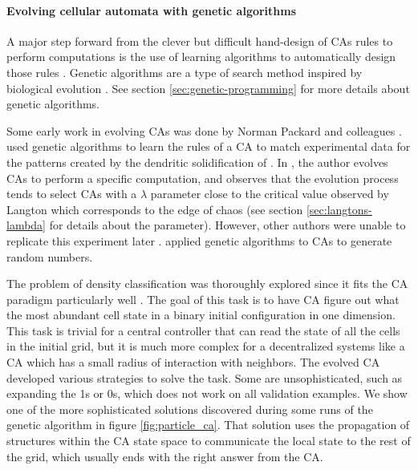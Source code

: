 \paragraph{Evolving cellular automata with genetic algorithms}
A major step forward from the clever but difficult hand-design of \acp{CA} rules
to perform computations is the use of learning algorithms to automatically
design those rules \parencite{mitchellEvolvingCellularAutomata1996}. Genetic
algorithms are a type of search method inspired by biological evolution
\parencite{bookerClassifierSystemsGenetic1989}. See section
\ref{sec:genetic-programming} for more details about genetic algorithms.

Some early work in evolving \acp{CA} was done by Norman Packard and colleagues
\parencite{packardAdaptationEdgeChaos1988,
  richardsExtractingCellularAutomaton1990}.
\textcite{richardsExtractingCellularAutomaton1990} used genetic algorithms to
learn the rules of a \ac{CA} to match experimental data for the patterns created
by the dendritic solidification of . In
\parencite{packardAdaptationEdgeChaos1988}, the author evolves \acp{CA} to
perform a specific computation, and observes that the evolution process tends to
select \acp{CA} with a $\lambda$ parameter close to the critical value observed by
Langton which corresponds to the edge of chaos (see section
\ref{sec:langtons-lambda} for details about the parameter). However, other
authors were unable to replicate this experiment later
\parencite{mitchellRevisitingEdgeChaos1993}.
\textcite{kozaEvolutionSubsumptionUsing1992} applied genetic algorithms to
\acp{CA} to generate random numbers.

The problem of density classification was thoroughly explored since it fits the
\ac{CA} paradigm particularly well \parencite{mitchellRevisitingEdgeChaos1993,
  mitchellEvolvingCellularAutomata1994,
  crutchfieldEvolutionEmergentComputation1995, dasGeneticAlgorithmDiscovers1994,
  sipperCoevolvingNonuniformCellular1996, andreDiscoveryGeneticProgramming1996}.
The goal of this task is to have \ac{CA} figure out what the most abundant cell
state in a binary initial configuration in one dimension. This task is trivial
for a central controller that can read the state of all the cells in the initial
grid, but it is much more complex for a decentralized systems like a \ac{CA}
which has a small radius of interaction with neighbors. The evolved \ac{CA}
developed various strategies to solve the task. Some are unsophisticated, such
as expanding the 1s or 0s, which does not work on all validation examples. We
show one of the more sophisticated solutions discovered during some runs of the
genetic algorithm in figure \ref{fig:particle_ca}. That solution uses the
propagation of structures within the \ac{CA} state space to communicate the
local state to the rest of the grid, which usually ends with the right answer
from the \ac{CA}.


